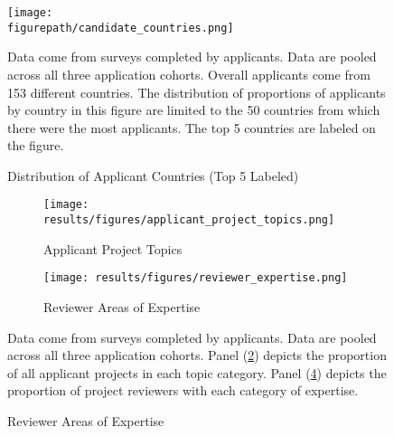     
    \newpage
    \begin{landscape}
    \begin{figure}[!htb]
    \centering
        \caption{Distribution of Applicant Countries (Top 5 Labeled) }\label{fig:country_dist_all}
      \texttt{[image: \\figurepath/candidate\_countries.png]} 
        \begin{notes}
        Data come from surveys completed by applicants. Data are pooled across all three application cohorts. Overall applicants come from 153 different countries. The distribution of proportions of applicants by country in this figure are limited to the 50 countries from which there were the most applicants. The top 5 countries are labeled on the figure. 
        \end{notes}
    \end{figure}
    \end{landscape}
    
    
    \begin{figure}[!htb]
        \centering
        \caption{Distributions of Applicant Project Topics and Reviewer Expertise} \label{fig:topic_expertise_dist}
        \begin{subfigure}[t]{\textwidth}
            \centering
                    \caption{Applicant Project Topics} \label{subfig:app_proj_topics}
            \texttt{[image: results/figures/applicant\_project\_topics.png]} 
        \end{subfigure}
        \hfill
        \vspace{1em}
        \begin{subfigure}[t]{\textwidth}
            \centering
                   \caption{Reviewer Areas of Expertise} \label{subfig:rev_expertise}
            \texttt{[image: results/figures/reviewer\_expertise.png]} 
        \end{subfigure}
        \begin{notes}
        Data come from surveys completed by applicants. Data are pooled across all three application cohorts. Panel (\ref{subfig:app_proj_topics}) depicts the proportion of all applicant projects in each topic category. Panel (\ref{subfig:rev_expertise}) depicts the proportion of project reviewers with each category of expertise.
        \end{notes}
    \end{figure}
    
